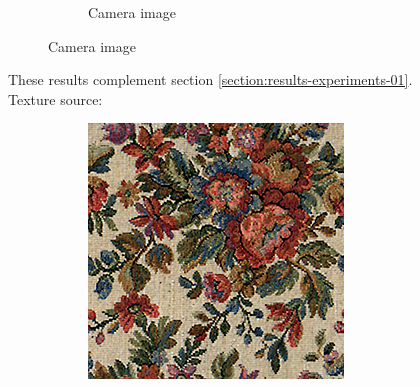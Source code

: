\begin{figure}[]
\begin{subfigure}{\textwidth}
\begin{subfigure}{0.24\textwidth}
            \caption*{Camera image}
        \end{subfigure}
    \end{subfigure}
    \caption{These results complement section \ref{section:results-experiments-01}. Texture source: \citet{Gatys2015}}
    \label{fig:ex01-complete-pebbles-1000steps}
\end{figure}

\begin{figure}[]
    \centering    
    \begin{subfigure}{\textwidth}
        \centering
        \begin{subfigure}{0.24\textwidth}
            \centering
            \includegraphics[width=\textwidth]{images/04-experiment01/flowers/target.jpg}
            \caption*{}
        \end{subfigure}
        \hfill
        \begin{subfigure}{0.24\textwidth}
            \centering

\end{subfigure}
\end{subfigure}
\end{figure}
